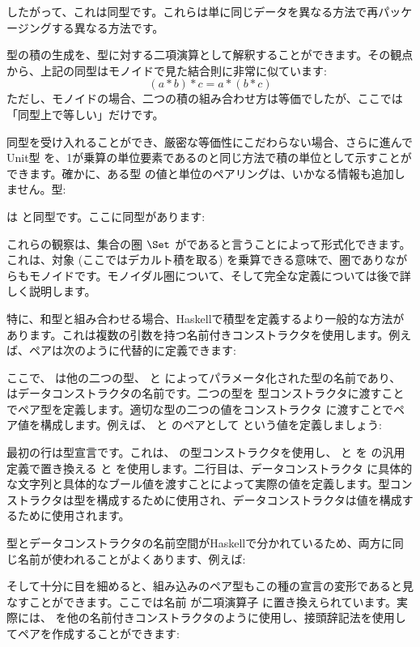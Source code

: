 したがって、これは同型です。これらは単に同じデータを異なる方法で再パッケージングする異なる方法です。

型の積の生成を、型に対する二項演算として解釈することができます。その観点から、上記の同型はモノイドで見た結合則に非常に似ています: 
\[(a * b) * c = a * (b * c)\]
ただし、モノイドの場合、二つの積の組み合わせ方は等価でしたが、ここでは「同型上で等しい」だけです。

同型を受け入れることができ、厳密な等価性にこだわらない場合、さらに進んでUnit型 \code{()} を、1が乗算の単位要素であるのと同じ方法で積の単位として示すことができます。確かに、ある型  の値と単位のペアリングは、いかなる情報も追加しません。型: 

は  と同型です。ここに同型があります: 


これらの観察は、集合の圏 $\Set$ がであると言うことによって形式化できます。これは、対象 (ここではデカルト積を取る) を乗算できる意味で、圏でありながらもモノイドです。モノイダル圏について、そして完全な定義については後で詳しく説明します。

特に、和型と組み合わせる場合、Haskellで積型を定義するより一般的な方法があります。これは複数の引数を持つ名前付きコンストラクタを使用します。例えば、ペアは次のように代替的に定義できます: 

ここで、 は他の二つの型、 と  によってパラメータ化された型の名前であり、 はデータコンストラクタの名前です。二つの型を  型コンストラクタに渡すことでペア型を定義します。適切な型の二つの値をコンストラクタ  に渡すことでペア値を構成します。例えば、 と  のペアとして  という値を定義しましょう: 

最初の行は型宣言です。これは、 の型コンストラクタを使用し、 と  を  の汎用定義で置き換える  と  を使用します。二行目は、データコンストラクタ  に具体的な文字列と具体的なブール値を渡すことによって実際の値を定義します。型コンストラクタは型を構成するために使用され、データコンストラクタは値を構成するために使用されます。

型とデータコンストラクタの名前空間がHaskellで分かれているため、両方に同じ名前が使われることがよくあります、例えば: 

そして十分に目を細めると、組み込みのペア型もこの種の宣言の変形であると見なすことができます。ここでは名前  が二項演算子 \code{(,)} に置き換えられています。実際には、\code{(,)} を他の名前付きコンストラクタのように使用し、接頭辞記法を使用してペアを作成することができます: 

